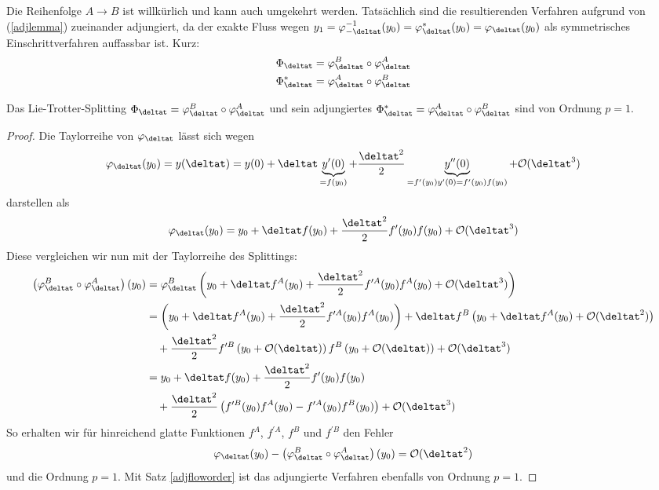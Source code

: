 \hfill%
\begin{minipage}{0.7\textwidth}
Die Reihenfolge $A\to B$ ist willkürlich und kann auch umgekehrt werden. Tatsächlich sind die resultierenden Verfahren aufgrund von (\ref{adjlemma}) zueinander adjungiert, da der exakte Fluss wegen $y_1=\varphi_{-\deltat}^{-1}(y_0)=\varphi_{\deltat}^*(y_0)=\varphi_{\deltat}(y_0)$ als symmetrisches Einschrittverfahren auffassbar ist. Kurz:\\
\begin{align}
\label{liesplittings}
\Phi_{\deltat}=\varphi_{\deltat}^B \circ \varphi_{\deltat}^A\\
\Phi_{\deltat}^*=\varphi_{\deltat}^A \circ \varphi_{\deltat}^B\nonumber
\end{align} 
\end{minipage}

\begin{maththeorem}
\label{lieorder1}
Das Lie-Trotter-Splitting $\Phi_{\deltat}=\varphi_{\deltat}^B \circ \varphi_{\deltat}^A$ und sein adjungiertes $\Phi_{\deltat}^*=\varphi_{\deltat}^A \circ \varphi_{\deltat}^B$ sind von Ordnung $p=1$.
\end{maththeorem}
\begin{proof}
Die Taylorreihe von $\varphi_{\deltat}$ lässt sich wegen 
\[\varphi_{\deltat}(y_0)=y(\deltat)=y(0)+\deltat \underbrace{y^\prime(0)}_{=f(y_0)}
+\frac{\deltat^2}{2}\underbrace{y^{\prime\prime}(0)}_{=f^\prime(y_0)y^\prime(0)=f^\prime(y_0)f(y_0)}+\mathcal{O}(\deltat^3)\] darstellen als 
\[\varphi_{\deltat}(y_0)=y_0+\deltat f(y_0)+\frac{\deltat^2}{2}f^\prime(y_0)f(y_0)+\mathcal{O}(\deltat^3)\]
Diese vergleichen wir nun mit der Taylorreihe des Splittings:
\begin{align*}
\left(\varphi_{\deltat}^B \circ \varphi_{\deltat}^A\right)(y_0)&=
\varphi_{\deltat}^B\left(y_0+\deltat f^A(y_0)+\frac{\deltat^2}{2}f^{\prime A}(y_0)f^A(y_0)+\mathcal{O}(\deltat^3)\right)\\
&=\left(y_0+\deltat f^A(y_0)+\frac{\deltat^2}{2}f^{\prime A}(y_0)f^A(y_0)\right)
+\deltat f^B\left(y_0+\deltat f^A(y_0)+\mathcal{O}(\deltat^2)\right)\\
&\quad+\frac{\deltat^2}{2}f^{\prime B}\left(y_0+\mathcal{O}(\deltat)\right)f^B\left(y_0+\mathcal{O}(\deltat)\right)+\mathcal{O}(\deltat^3)\\
&=y_0+\deltat f(y_0)+\frac{\deltat^2}{2}f^\prime(y_0)f(y_0)\\
&\quad+\frac{\deltat^2}{2}\left(f^{\prime B}(y_0)f^A(y_0)-f^{\prime A}(y_0)f^B(y_0)\right)+\mathcal{O}(\deltat^3)
\end{align*}
So erhalten wir für hinreichend glatte Funktionen $f^A$, $f^{\prime A}$, $f^B$ und $f^{\prime B}$ den Fehler \[\varphi_{\deltat}(y_0)-\left(\varphi_{\deltat}^B \circ \varphi_{\deltat}^A\right)(y_0)=\mathcal{O}(\deltat^2)\] und die Ordnung $p=1$. Mit Satz \ref{adjfloworder} ist das adjungierte Verfahren ebenfalls von Ordnung $p=1$.
\end{proof}

